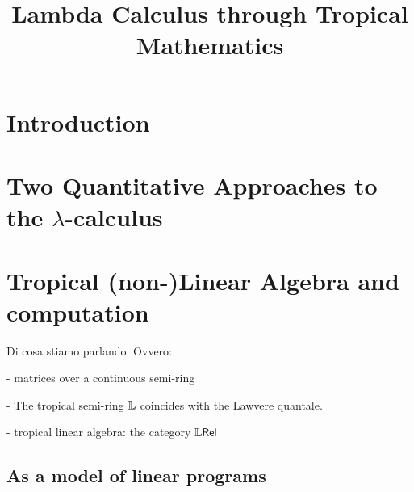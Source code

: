 \documentclass[conference]{IEEEtran}
\begin{document}
\title{Lambda Calculus through Tropical Mathematics}

\author{
\and
{}
}

\maketitle

\begin{abstract}

\end{abstract}

\begin{IEEEkeywords}
\end{IEEEkeywords}

\section{Introduction}




\section{Two Quantitative Approaches to the $\lambda$-calculus}




\section{Tropical (non-)Linear Algebra and computation}

Di cosa stiamo parlando. Ovvero:

- matrices over a continuous semi-ring

- The tropical semi-ring $\mathbb{L}$ coincides with the Lawvere quantale. 

- tropical linear algebra: the category $\mathbb{L}\mathsf{Rel}$


\subsection{As a model of linear programs}
\end{document}
